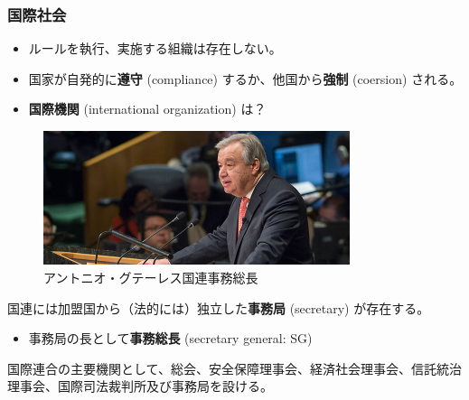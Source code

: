 \documentclass[
  xelatex,
  ja=standard]{bxjsarticle}
\providecommand{\tightlist}{%
  \setlength{\itemsep}{0pt}\setlength{\parskip}{0pt}}\usepackage{longtable,booktabs,array}
\begin{document}
\hypertarget{ux56fdux969bux793eux4f1a-1}{%
\subsubsection{国際社会}\label{ux56fdux969bux793eux4f1a-1}}

\begin{itemize}
\tightlist
\item
  ルールを執行、実施する組織は存在しない。
\item
  国家が自発的に\textbf{遵守} (compliance) するか、他国から\textbf{強制}
  (coersion) される。
\item
  \textbf{国際機関} (international organization) は？
\end{itemize}

\begin{figure}[htpb]

{\centering \includegraphics[width=0.8\textwidth,height=\textheight]{international_society_files/mediabag/707593-guterres-sg.jpg}

}

\caption{アントニオ・グテーレス国連事務総長}

\end{figure}

国連には加盟国から（法的には）独立した\textbf{事務局} (secretary)
が存在する。

\begin{itemize}
\tightlist
\item
  事務局の長として\textbf{事務総長} (secretary general: SG)
\end{itemize}

\begin{tcolorbox}[enhanced jigsaw, titlerule=0mm, leftrule=.75mm, toprule=.15mm, title=\textcolor{quarto-callout-note-color}{\faInfo}\hspace{0.5em}{\href{https://www.unic.or.jp/info/un/charter/text_japanese/}{国連憲章}　第7条1項}, left=2mm, colbacktitle=quarto-callout-note-color!10!white, rightrule=.15mm, opacitybacktitle=0.6, colframe=quarto-callout-note-color-frame, breakable, coltitle=black, opacityback=0, bottomrule=.15mm, colback=white, bottomtitle=1mm, toptitle=1mm, arc=.35mm]

国際連合の主要機関として、総会、安全保障理事会、経済社会理事会、信託統治理事会、国際司法裁判所及び事務局を設ける。

\end{tcolorbox}
\end{document}
